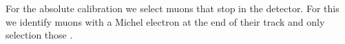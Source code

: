 \documentclass[12pt,a4paper]{article}
\begin{document}



For the absolute calibration we select muons that stop in the detector. For this we identify muons with a Michel electron at the end of their track and only selection those \cite{NOVA-doc-13579-FACalorimetricEnergyScale}.
\end{document}
